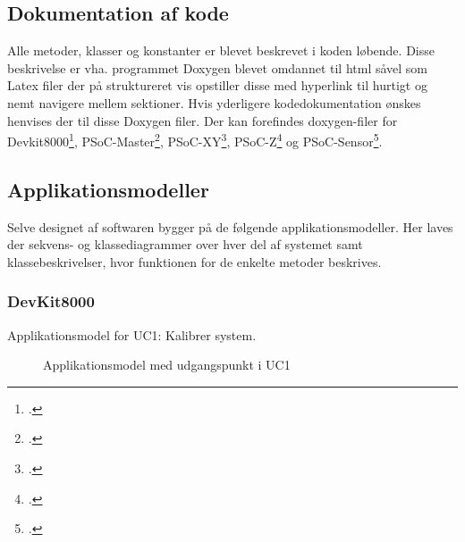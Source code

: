 \subsection{Dokumentation af kode}
Alle metoder, klasser og konstanter er blevet beskrevet i koden løbende. Disse beskrivelse er vha. programmet Doxygen blevet omdannet til html såvel som Latex filer der på struktureret vis opstiller disse med hyperlink til hurtigt og nemt navigere mellem sektioner. Hvis yderligere kodedokumentation ønskes henvises der til disse Doxygen filer. Der kan forefindes doxygen-filer for Devkit8000\footcite{doxy-devkit}, PSoC-Master\footcite{doxy-master}, PSoC-XY\footcite{doxy-xy}, PSoC-Z\footcite{doxy-z} og PSoC-Sensor\footcite{doxy-sensor}.

\subsection{Applikationsmodeller}

Selve designet af softwaren bygger på de følgende applikationsmodeller. Her laves der sekvens- og klassediagrammer over hver del af systemet samt klassebeskrivelser, hvor funktionen for de enkelte metoder beskrives.

\subsubsection{DevKit8000}

Applikationsmodel for UC1: Kalibrer system.

\begin{figure}[H] \centering
    \caption{Applikationsmodel med udgangspunkt i UC1}
    \label{fig:uc1App}
\end{figure}


